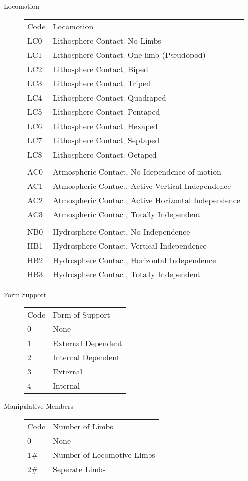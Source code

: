 \begin{description}
	\item[Locomotion]
		\begin{tabular}[t]{ll}
		Code &	Locomotion \\
		LC0	 &	Lithosphere Contact, No Limbs \\
		LC1	 &	Lithosphere Contact, One limb (Pseudopod) \\
		LC2	 &	Lithosphere Contact, Biped \\
		LC3	 &	Lithosphere Contact, Triped \\
		LC4	 &	Lithosphere Contact, Quadraped \\
		LC5	 &	Lithosphere Contact, Pentaped \\
		LC6	 &	Lithosphere Contact, Hexaped \\
		LC7	 &	Lithosphere Contact, Septaped \\
		LC8	 &	Lithosphere Contact, Octaped \\
			 &	                              \\
		AC0	 &	Atmospheric Contact, No Idependence of motion \\
		AC1	 &	Atmospheric Contact, Active Vertical Independence \\
		AC2	 &	Atmospheric Contact, Active Horizontal Independence \\
		AC3	 &	Atmospheric Contact, Totally Independent \\
			 &                                           \\
		NB0	 &	Hydrosphere Contact, No Independence \\
		HB1	 &	Hydrosphere Contact, Vertical Independence \\
		HB2	 &	Hydrosphere Contact, Horizontal Independence \\
		HB3	 &	Hydrosphere Contact, Totally Independent \\
		\end{tabular}

	\item[Form Support]
		\begin{tabular}{ll}
		Code  &	Form of Support \\
		0	 &	None \\
		1	 &	External Dependent \\
		2	 &	Internal Dependent \\
		3	 &	External \\
		4	 &	Internal \\
		\end{tabular}

	\item[Manipulative Members]
		\begin{tabular}{ll}
		Code 	 &	Number of Limbs \\
		0		 &	None \\
		1\#		 &	Number of Locomotive Limbs \\
		2\#		 &	Seperate Limbs \\
		\end{tabular}


\end{description}
